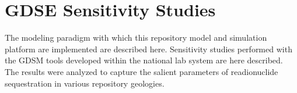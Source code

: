 \chapter{GDSE Sensitivity Studies}\label{ch:sensitivity}

The modeling paradigm with which this repository model and simulation 
platform are implemented are described here. 
Sensitivity studies performed with the \gls{GDSM} tools developed within
the national lab system are here described. The results were analyzed to 
capture the salient parameters of readionuclide sequestration in 
various repository geologies.


%
%
%
%
%
%

